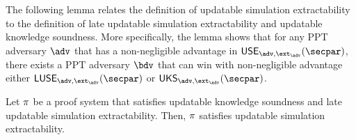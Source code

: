 The following lemma relates the definition of updatable simulation extractability to the definition of late updatable simulation extractability and updatable knowledge soundness. More specifically, the lemma shows that for any PPT adversary $\advse$ that has a non-negligible advantage in $\USE_{\advse,\ext_{\advse}}(\secpar)$, there exists a PPT adversary $\bdv$ that can win with non-negligible advantage either $\LUSE_{\advse,\ext_{\advse}}(\secpar)$ or $\UKS_{\advse,\ext_{\advse}}(\secpar)$.

\begin{lemma}
	Let $\pi$ be a proof system that satisfies updatable knowledge soundness and late updatable simulation extractability. Then, $\pi$
	satisfies updatable simulation extractability.
\end{lemma}
